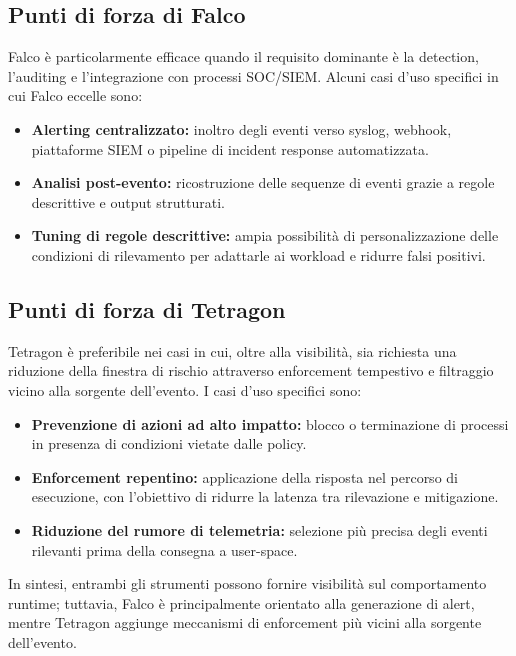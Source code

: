 \documentclass[12pt,a4paper,openright,twoside]{book}
\newcommand{\userspace}{\mbox{user-space}\xspace}
\begin{document}
\subsection{Punti di forza di Falco}
Falco è particolarmente efficace quando il requisito dominante è la detection, l'auditing e l'integrazione con processi SOC/SIEM. Alcuni casi d'uso specifici in cui Falco eccelle sono:
\begin{itemize}
    \item \textbf{Alerting centralizzato:} inoltro degli eventi verso syslog, webhook, piattaforme SIEM o pipeline di incident response automatizzata.
    \item \textbf{Analisi post-evento:} ricostruzione delle sequenze di eventi grazie a regole descrittive e output strutturati.
    \item \textbf{Tuning di regole descrittive:} ampia possibilità di personalizzazione delle condizioni di rilevamento per adattarle ai workload e ridurre falsi positivi.
\end{itemize}
\cite{falco-use-cases,falco-docs}

\subsection{Punti di forza di Tetragon}
Tetragon è preferibile nei casi in cui, oltre alla visibilità, sia richiesta una riduzione della finestra di rischio attraverso enforcement tempestivo e filtraggio vicino alla sorgente dell'evento. I casi d'uso specifici sono:
\begin{itemize}
    \item \textbf{Prevenzione di azioni ad alto impatto:} blocco o terminazione di processi in presenza di condizioni vietate dalle policy.
    \item \textbf{Enforcement repentino:} applicazione della risposta nel percorso di esecuzione, con l'obiettivo di ridurre la latenza tra rilevazione e mitigazione.
    \item \textbf{Riduzione del rumore di telemetria:} selezione più precisa degli eventi rilevanti prima della consegna a \userspace.
\end{itemize}
\cite{tetragon-docs,tetragon-docs-hooks}

\bigskip\noindent
In sintesi, entrambi gli strumenti possono fornire visibilità sul comportamento runtime; tuttavia, Falco è principalmente orientato alla generazione di alert, mentre Tetragon aggiunge meccanismi di enforcement più vicini alla sorgente dell'evento.
\end{document}

